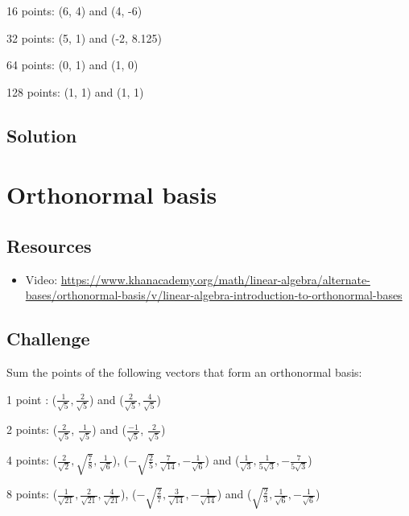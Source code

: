 16 points: (6, 4) and (4, -6)

32 points: (5, 1) and (-2, 8.125)

64 points: (0, 1) and (1, 0)

128 points: (1, 1) and (1, 1)

\subsection*{Solution}
\six{}


\timebox




\newpage
\section{Orthonormal basis}

\subsection*{Resources}
\begin{itemize}
    \item Video: \url{https://www.khanacademy.org/math/linear-algebra/alternate-bases/orthonormal-basis/v/linear-algebra-introduction-to-orthonormal-bases}
\end{itemize}

\subsection*{Challenge}
Sum the points of the following vectors that form an orthonormal basis:

1 point :
($\displaystyle \frac{1}{\sqrt{5}}, \frac{2}{\sqrt{5}}$) and
($\displaystyle \frac{2}{\sqrt{5}}, \frac{4}{\sqrt{5}}$)

2 points:
($\displaystyle \frac{2}{\sqrt{5}}$, $\displaystyle \frac{1}{\sqrt{5}}$) and
($\displaystyle \frac{-1}{\sqrt{5}}$, $\displaystyle \frac{2}{\sqrt{5}}$)

4 points:
($\displaystyle \frac{2}{\sqrt{2}}, \sqrt{\frac{7}{8}}, \frac{1}{\sqrt{6}}$),
($\displaystyle -\sqrt{\frac{2}{5}}, \frac{7}{\sqrt{14}}, -\frac{1}{\sqrt{6}}$) and
($\displaystyle \frac{1}{\sqrt{3}},  \frac{1}{5 \sqrt{3}}, -\frac{7}{5 \sqrt{3}}$)

8 points:
($\displaystyle \frac{1}{\sqrt{21}}, \frac{2}{\sqrt{21}}, \frac{4}{\sqrt{21}}$),
($\displaystyle -\sqrt{\frac{2}{7}}, \frac{3}{\sqrt{14}}, -\frac{1}{\sqrt{14}}$) and
($\displaystyle \sqrt{\frac{2}{3}},  \frac{1}{\sqrt{6}}, -\frac{1}{\sqrt{6}}$)

